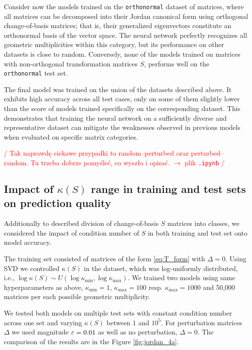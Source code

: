 Consider now the models trained on the \texttt{orthonormal} dataset of matrices, where all matrices can be decomposed into their Jordan canonical form using orthogonal change-of-basis matrices; that is, their generalized eigenvectors constitute an orthonormal basis of the vector space. The neural network perfectly recognizes all geometric multiplicities within this category, but its performance on other datasets is close to random. Conversely, none of the models trained on matrices with non-orthogonal transformation matrices $S$, performs well on the \texttt{orthonormal} test set.

The final model was trained on the union of the datasets described above. It exhibits high accuracy across all test cases, only on some of them slightly lower than the score of models trained specifically on the corresponding dataset. This demonstrates that training the neural network on a sufficiently diverse and representative dataset can mitigate the weaknesses observed in previous models when evaluated on specific matrix categories.

\textcolor{red}{/ Tak naprawdę ciekawe przypadki to random--perturbed oraz perturbed--random. Tu trzeba dobrze pomyśleć, co wyszło i opisać. $\longrightarrow$ plik \texttt{.ipynb} /}

\subsection*{Impact of $\kappa(S)$ range in training and test sets on prediction quality}

Additionally to described division of change-of-basis $S$ matrices into classes, we considered the impact of condition number of $S$ in both training and test set onto model accuracy. 

The training set consisted of matrices of the form \eqref{eq:T_form} with $\Delta = 0$. Using SVD we controlled $\kappa(S)$ in the dataset, which was log-uniformly distributed, i.e., $\log\kappa(S) \sim U(\log\kappa_{\min}, \log\kappa_{\max})$. We trained two models using same hyperparameters as above, $\kappa_{\min} = 1$, $\kappa_{\max} = 100$ resp. $\kappa_{\max} = 1000$ and 50,000 matrices per each possible geometric multiplicity. 

We tested both models on multiple test sets with constant condition number across one set and varying $\kappa(S)$ between $1$ and $10^5$. For perturbation matrices $\Delta$ we used magnitude $\varepsilon=0.01$ as well as no perturbation, $\Delta = 0$. The comparison of the results are in the Figure \ref{fig:jordan_4a}.

